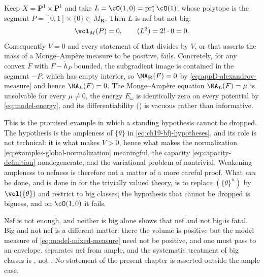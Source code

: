 \begin{example}
\label{ex:ch31-nef-not-big}
Keep \(X=\mathbf P^1\times\mathbf P^1\) and take
\(L=\cO(1,0)=\operatorname{pr}_1^*\cO(1)\),
whose polytope is the segment \(P=[0,1]\times\{0\}\subset M_\mathbf R\).
Then \(L\) is nef but not big:
\[
 \vol_M(P)=0,\qquad (L^2)=2!\cdot0=0 .
\]
Consequently \(V=0\) and every statement of  that divides by
\(V\), or that asserts the mass of a Monge--Amp\`ere measure to be positive,
fails.  Concretely, for any convex \(F\) with \(F-\check h_P\) bounded, the
subgradient image is contained in the segment \(-P\), which has empty
interior, so \(\MA_{\mathbf R}(F)=0\) by
\eqref{eq:appD-alexandrov-measure} and hence \(\MA_L(F)=0\).  The
Monge--Amp\`ere equation \(\MA_L(F)=\mu\) is unsolvable for every
\(\mu\neq0\), the energy \(E_\omega\) is identically zero on every potential
by \eqref{eq:model-energy}, and its differentiability
() is vacuous rather than
informative.

This is the promised example in which a standing hypothesis cannot be
dropped.  The hypothesis is the ampleness of \(\{\theta\}\) in
\eqref{eq:ch19-bfj-hypotheses}, and its role is not technical: it is what
makes \(V>0\), hence what makes the normalization
\eqref{eq:examples-global-normalization} meaningful, the capacity
\eqref{eq:capacity-definition} nondegenerate, and the variational problem of
 nontrivial.  Weakening ampleness to
nefness is therefore not a matter of a more careful proof.  What
\emph{can} be done, and is done in  for the trivially valued
theory, is to replace \((\{\theta\}^n)\) by \(\vol(\{\theta\})\) and restrict
to big classes; the hypothesis that cannot be dropped is bigness, and on
\(\cO(1,0)\) it fails.
\end{example}

\begin{warning}{Nef is not enough, and neither is big alone}
 shows that nef and not big is fatal.  Big and not
nef is a different matter: there the volume is positive but the model
measure of \eqref{eq:model-mixed-measure} need not be positive, and one must
pass to an envelope.   separates nef from ample,
and the systematic treatment of big classes is , not
.  No statement of the present chapter is asserted outside
the ample case.
\end{warning}

